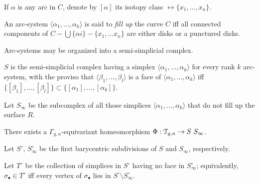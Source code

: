 If $\alpha$ is any arc in $C$, denote by $[\alpha]$ its isotopy class $\rel
\{x_1, \ldots, x_n\}$.

\begin{definition}
  An arc-system $\langle\alpha_1, \ldots, \alpha_k\rangle$ is said to \emph{fill up} the curve
  $C$ iff all connected components of $C - \bigcup\{\alpha i\} - \{x_1,\ldots x_n\}$ are
  either disks or a punctured disks.
\end{definition}

Arc-systems may be organized into a semi-simplicial complex.
\begin{definition}
  $S$ is the semi-simplicial complex having a simplex $\langle\alpha_1, \ldots, \alpha_k\rangle$
  for every rank $k$ arc-system, with the proviso that $\langle\beta_1, \ldots, \beta_l\rangle$
  is a face of $\langle\alpha_1, \ldots, \alpha_k\rangle$ iff $\{ [\beta_1], \ldots, [\beta_l] \} \subset \{ [\alpha_1], \ldots,
  [\alpha_k] \}$.
  
  Let $S_\infty$ be the subcomplex of all those simplices $\langle\alpha_1, \ldots, \alpha_k\rangle$
  that do not fill up the surface $R$.
\end{definition}

\begin{theorem}
There exists a $\Gamma_{g,n}$-equivariant homeomorphism $\Phi: \T_{g,n} \to S \ S_\infty$.
\end{theorem}

Let $S^\circ$, $S_\infty^\circ$ be the first barycentric subdivisions of $S$
and $S_\infty$, respectively.

\begin{definition}
  Let $T^\circ$ be the collection of simplices in $S^\circ$ having no face in
  $S_\infty^\circ$; equivalently, $\sigma_\bullet \in T^\circ$ iff every vertex of $\sigma_\bullet$
  lies in $S^\circ \setminus S_\infty^\circ$.
\end{definition}


